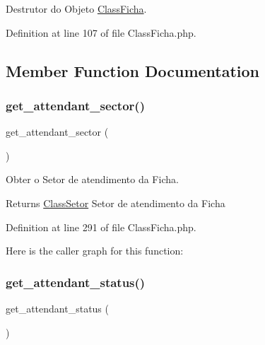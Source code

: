 Destrutor do Objeto \hyperlink{class_class_ficha}{Class\+Ficha}. 



Definition at line 107 of file Class\+Ficha.\+php.



\subsection{Member Function Documentation}
\mbox{\label{class_class_ficha_a85465890c6a10587eabeac707aa3caf0}} 
\subsubsection{\texorpdfstring{get\+\_\+attendant\+\_\+sector()}{get\_attendant\_sector()}}
{\footnotesize\ttfamily get\+\_\+attendant\+\_\+sector (\begin{DoxyParamCaption}{ }\end{DoxyParamCaption})}



Obter o Setor de atendimento da Ficha. 

\begin{DoxyReturn}{Returns}
\hyperlink{class_class_setor}{Class\+Setor} Setor de atendimento da Ficha 
\end{DoxyReturn}


Definition at line 291 of file Class\+Ficha.\+php.

Here is the caller graph for this function\+:
\mbox{\label{class_class_ficha_af0d76aee9d27ee2d61843cd94825ee88}} 
\subsubsection{\texorpdfstring{get\+\_\+attendant\+\_\+status()}{get\_attendant\_status()}}
{\footnotesize\ttfamily get\+\_\+attendant\+\_\+status (\begin{DoxyParamCaption}{ }\end{DoxyParamCaption})}




